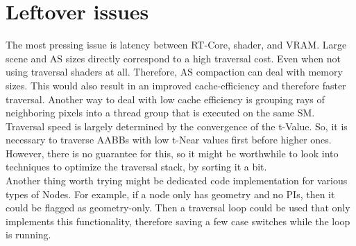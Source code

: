 \section{Leftover issues}
The most pressing issue is latency between RT-Core, shader, and VRAM. Large scene and AS sizes directly correspond to a high traversal cost. Even when not using traversal shaders at all. Therefore, AS compaction can deal with memory sizes. This would also result in an improved cache-efficiency and therefore faster traversal. Another way to deal with low cache efficiency is grouping rays of neighboring pixels into a thread group that is executed on the same SM.\\
Traversal speed is largely determined by the convergence of the t-Value. So, it is necessary to traverse AABBs with low t-Near values first before higher ones. However, there is no guarantee for this, so it might be worthwhile to look into techniques to optimize the traversal stack, by sorting it a bit.\\
Another thing worth trying might be dedicated code implementation for various types of Nodes. For example, if a node only has geometry and no PIs, then it could be flagged as geometry-only. Then a traversal loop could be used that only implements this functionality, therefore saving a few case switches while the loop is running.
